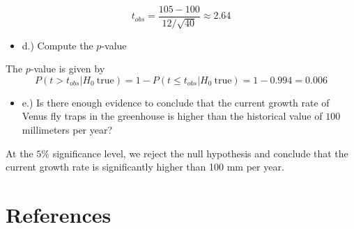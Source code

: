 \documentclass[
]{article}
\providecommand{\tightlist}{%
  \setlength{\itemsep}{0pt}\setlength{\parskip}{0pt}}
\begin{document}
{ \[t_{obs} = \frac{105 - 100}{12/\sqrt{40}} \approx 2.64 \] }

\begin{itemize}
\tightlist
\item
  d.) Compute the \(p\)-value
\end{itemize}

{The \(p\)-value is given by
\[P(t > t_{obs}| H_0 \ \text{true}) = 1 - P(t \leq t_{obs}| H_0 \ \text{true}) = 1 - 0.994 = 0.006\]
}

\begin{itemize}
\tightlist
\item
  e.) Is there enough evidence to conclude that the current growth rate
  of Venus fly traps in the greenhouse is higher than the historical
  value of \(100\) millimeters per year?
\end{itemize}

{At the \(5\%\) significance level, we reject the null hypothesis and
conclude that the current growth rate is significantly higher than 100
mm per year.}

\newpage

\section*{References}\label{references}
\end{document}
